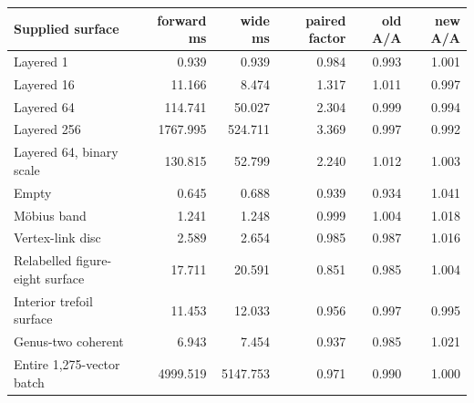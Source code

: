 \begin{center}
\small
\begin{tabular}{lrrrrr}
\toprule
Supplied surface & forward ms & wide ms & paired factor & old A/A & new A/A\\
\midrule
Layered 1 & 0.939 & 0.939 & 0.984 & 0.993 & 1.001\\
Layered 16 & 11.166 & 8.474 & 1.317 & 1.011 & 0.997\\
Layered 64 & 114.741 & 50.027 & 2.304 & 0.999 & 0.994\\
Layered 256 & 1767.995 & 524.711 & 3.369 & 0.997 & 0.992\\
Layered 64, binary scale & 130.815 & 52.799 & 2.240 & 1.012 & 1.003\\
Empty & 0.645 & 0.688 & 0.939 & 0.934 & 1.041\\
M\"obius band & 1.241 & 1.248 & 0.999 & 1.004 & 1.018\\
Vertex-link disc & 2.589 & 2.654 & 0.985 & 0.987 & 1.016\\
Relabelled figure-eight surface & 17.711 & 20.591 & 0.851 & 0.985 & 1.004\\
Interior trefoil surface & 11.453 & 12.033 & 0.956 & 0.997 & 0.995\\
Genus-two coherent & 6.943 & 7.454 & 0.937 & 0.985 & 1.021\\
Entire 1,275-vector batch & 4999.519 & 5147.753 & 0.971 & 0.990 & 1.000\\
\bottomrule
\end{tabular}
\end{center}
